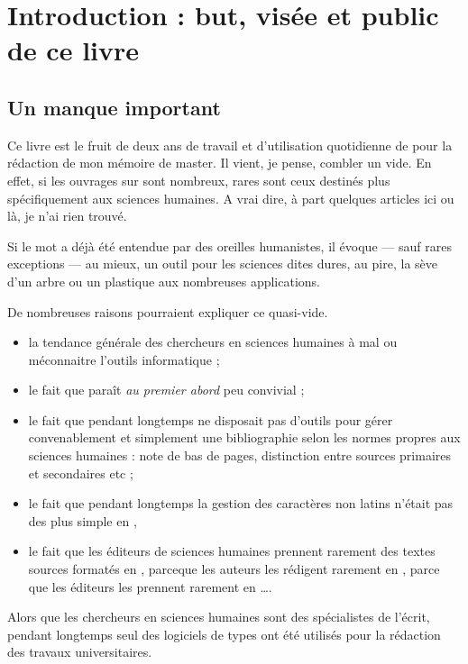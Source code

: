 \chapter{Introduction : but, visée et public de ce livre}
\section{Un manque important}

Ce livre est le fruit de deux ans de travail et d'utilisation quotidienne de \logiciel{\LaTeX} pour la rédaction de mon mémoire de master. Il vient, je pense, combler un vide. En effet, si les ouvrages sur \logiciel{\LaTeX} sont nombreux, rares sont ceux destinés plus spécifiquement aux sciences humaines. A vrai dire, à part quelques articles ici ou là, je n'ai rien trouvé.


Si le mot \logiciel{\LaTeX} a déjà été entendue par des oreilles humanistes, il évoque --- sauf rares exceptions --- au mieux, un outil pour les sciences dites dures, au pire, la sève d'un arbre ou un plastique aux nombreuses applications. 

De nombreuses raisons pourraient expliquer ce quasi-vide.
\begin{itemize}
\item la tendance générale des chercheurs en sciences humaines à mal ou méconnaitre l'outils informatique ;
\item le fait que \logiciel{\LaTeX} paraît \emph{au premier abord} peu convivial ;
\item le fait que pendant longtemps \logiciel{\LaTeX} ne disposait pas d'outils pour gérer convenablement et simplement une bibliographie selon les normes propres aux sciences humaines : note de bas de pages, distinction entre sources primaires et secondaires etc ;
\item le fait que pendant longtemps la gestion des caractères non latins n'était pas des plus simple en \logiciel{\LaTeX} ,
\item le fait que les éditeurs de sciences humaines prennent rarement des textes sources formatés en \logiciel{\LaTeX}, parceque les auteurs les rédigent rarement en \logiciel{\LaTeX}, parce que les éditeurs les prennent rarement en \logiciel{\LaTeX} \ldots.
\end{itemize}

Alors que les chercheurs en sciences humaines sont des spécialistes de l'écrit, pendant longtemps seul des logiciels de types  ont été utilisés pour la rédaction des travaux universitaires.

